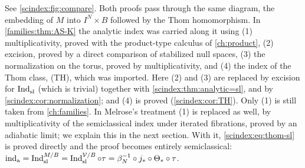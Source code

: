 \begin{remark}\label{scindex:rem:compare}
  See \cref{scindex:fig:compare}.
  Both proofs pass through the same diagram, the embedding of $M$ into
  $I^N\times B$ followed by the Thom homomorphism. In \cref{families:thm:AS-K} the
  analytic index was carried along it using (1) multiplicativity, proved with the
  product-type calculus of \cref{ch:product}, (2) excision, proved by a direct
  comparison of stabilized null spaces, (3) the normalization on the torus,
  proved by multiplicativity, and (4) the index of the Thom class, (TH), which was
  imported. Here (2) and (3) are replaced by excision for $\operatorname{Ind}^{}_{\mathrm{sl}}$ (which is
  trivial) together with \cref{scindex:thm:analytic=sl}, and by
  \cref{scindex:cor:normalization}; and (4) is proved
  (\cref{scindex:cor:TH}). Only (1) is still taken from \cref{ch:families}. In
  Melrose's treatment (1) is replaced as well, by multiplicativity of the
  semiclassical index under iterated fibrations, proved by an adiabatic limit; we
  explain this in the next section. With it, \eqref{scindex:eq:thom-sl} is
  proved directly and the proof becomes entirely semiclassical:
  $\operatorname{ind}_{\mathrm{a}}=\operatorname{Ind}^{M/B}_{\mathrm{sl}}=\operatorname{Ind}^{\mathcal V/B}_{\mathrm{sl}}\circ\tau=\beta_N^{-1}\circ j_*\circ
  \Theta_*\circ\tau$.
\end{remark}

